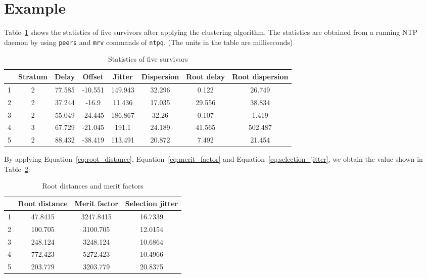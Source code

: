 \section{Example}%
\label{sec:example}
Table~\ref{tab:sur} shows the statistics of five survivors after applying the
clustering algorithm. The statistics are obtained from a running NTP daemon by
using \verb|peers| and \verb|mrv| commands of \verb|ntpq|. (The units in the
table are milliseconds)

\begin{table}[htpb]
    \centering
    \caption{Statistics of five survivors}
    \label{tab:sur}
    \begin{tabular}{|c|c|c|c|c|c|c|c|}
        \hline
         & Stratum & Delay & Offset & Jitter & Dispersion & Root delay & Root
        dispersion \\
        \hline
        1 & 2 & 77.585 & -10.551 & 149.943 & 32.296 & 0.122  & 26.749  \\
        2 & 2 & 37.244 & -16.9   & 11.436  & 17.035 & 29.556 & 38.834  \\
        3 & 2 & 55.049 & -24.445 & 186.867 & 32.26  & 0.107  & 1.419   \\
        4 & 3 & 67.729 & -21.045 & 191.1   & 24.189 & 41.565 & 502.487 \\
        5 & 2 & 88.432 & -38.419 & 113.491 & 20.872 & 7.492  & 21.454  \\
        \hline
    \end{tabular}
\end{table}

By applying Equation~\ref{eq:root_distance}, Equation~\ref{eq:merit_factor}
and Equation~\ref{eq:selection_jitter},
we obtain the value shown in Table~\ref{tab:root_distance}:
\begin{table}[!h]
    \centering
    \caption{Root distances and merit factors}
    \label{tab:root_distance}
    \begin{tabular}{|c|c|c|c|}
        \hline
         & Root distance & Merit factor & Selection jitter \\
        \hline
         1 & 47.8415 & 3247.8415 & 16.7339 \\
         2 & 100.705 & 3100.705  & 12.0154 \\
         3 & 248.124 & 3248.124  & 10.6864 \\
         4 & 772.423 & 5272.423  & 10.4966 \\
         5 & 203.779 & 3203.779  & 20.8375 \\
        \hline
    \end{tabular}
\end{table}

